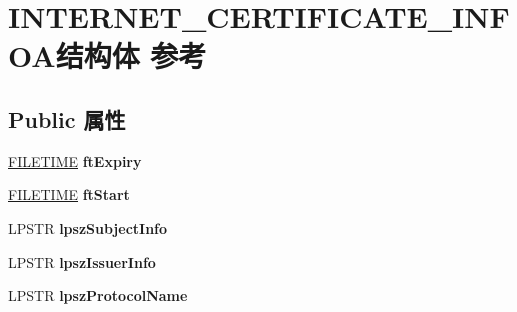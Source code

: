 \hypertarget{struct_i_n_t_e_r_n_e_t___c_e_r_t_i_f_i_c_a_t_e___i_n_f_o_a}{}\section{I\+N\+T\+E\+R\+N\+E\+T\+\_\+\+C\+E\+R\+T\+I\+F\+I\+C\+A\+T\+E\+\_\+\+I\+N\+F\+O\+A结构体 参考}
\label{struct_i_n_t_e_r_n_e_t___c_e_r_t_i_f_i_c_a_t_e___i_n_f_o_a}
\subsection*{Public 属性}
\begin{DoxyCompactItemize}
\item 
\mbox{\label{struct_i_n_t_e_r_n_e_t___c_e_r_t_i_f_i_c_a_t_e___i_n_f_o_a_ae52db2fd5b60c5113e330cd545d57575}} 
\hyperlink{struct___f_i_l_e_t_i_m_e}{F\+I\+L\+E\+T\+I\+ME} {\bfseries ft\+Expiry}
\item 
\mbox{\label{struct_i_n_t_e_r_n_e_t___c_e_r_t_i_f_i_c_a_t_e___i_n_f_o_a_a2aae0174255696785edf587499be0462}} 
\hyperlink{struct___f_i_l_e_t_i_m_e}{F\+I\+L\+E\+T\+I\+ME} {\bfseries ft\+Start}
\item 
\mbox{\label{struct_i_n_t_e_r_n_e_t___c_e_r_t_i_f_i_c_a_t_e___i_n_f_o_a_a356fdac2ec52cea1e072b2027f021848}} 
L\+P\+S\+TR {\bfseries lpsz\+Subject\+Info}
\item 
\mbox{\label{struct_i_n_t_e_r_n_e_t___c_e_r_t_i_f_i_c_a_t_e___i_n_f_o_a_a7f5d59bdf0bc1602a2bb412690c137de}} 
L\+P\+S\+TR {\bfseries lpsz\+Issuer\+Info}
\item 
\mbox{\label{struct_i_n_t_e_r_n_e_t___c_e_r_t_i_f_i_c_a_t_e___i_n_f_o_a_add5fd4d33ca6f71cd7c43c92ed0994d4}} 
L\+P\+S\+TR {\bfseries lpsz\+Protocol\+Name}
\item 
\mbox{\label{struct_i_n_t_e_r_n_e_t___c_e_r_t_i_f_i_c_a_t_e___i_n_f_o_a_a46604d800ca2ecda472538c1f7aa36d0}} 

\end{DoxyCompactItemize}
